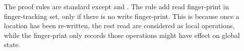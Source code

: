 The proof rules are standard except  and .
The  rule add read finger-print in finger-tracking set, only if there is no write finger-print.
This is because once a location has been re-written, the rest read are considered as local operations, while the finger-print only records those operations might have effect on global state.


